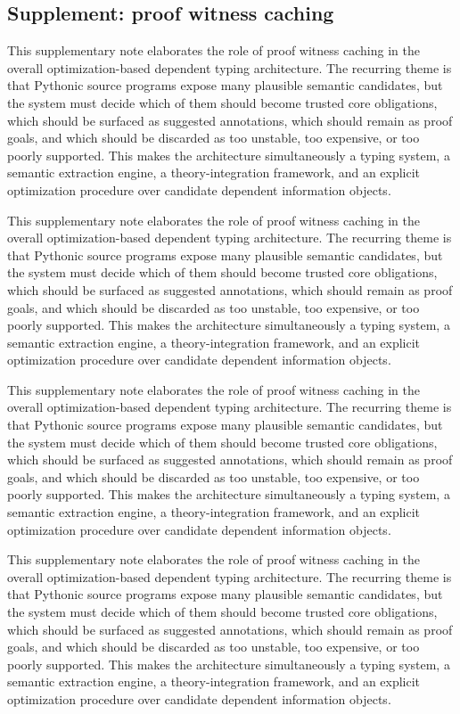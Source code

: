 \documentclass[11pt]{article}
\theoremstyle{definition}
\theoremstyle{plain}
\begin{document}
\subsection{Supplement: proof witness caching}
This supplementary note elaborates the role of proof witness caching in the overall
optimization-based dependent typing architecture. The recurring theme is that
Pythonic source programs expose many plausible semantic candidates, but the
system must decide which of them should become trusted core obligations, which
should be surfaced as suggested annotations, which should remain as proof
goals, and which should be discarded as too unstable, too expensive, or too
poorly supported. This makes the architecture simultaneously a typing system,
a semantic extraction engine, a theory-integration framework, and an explicit
optimization procedure over candidate dependent information objects.

This supplementary note elaborates the role of proof witness caching in the overall
optimization-based dependent typing architecture. The recurring theme is that
Pythonic source programs expose many plausible semantic candidates, but the
system must decide which of them should become trusted core obligations, which
should be surfaced as suggested annotations, which should remain as proof
goals, and which should be discarded as too unstable, too expensive, or too
poorly supported. This makes the architecture simultaneously a typing system,
a semantic extraction engine, a theory-integration framework, and an explicit
optimization procedure over candidate dependent information objects.

This supplementary note elaborates the role of proof witness caching in the overall
optimization-based dependent typing architecture. The recurring theme is that
Pythonic source programs expose many plausible semantic candidates, but the
system must decide which of them should become trusted core obligations, which
should be surfaced as suggested annotations, which should remain as proof
goals, and which should be discarded as too unstable, too expensive, or too
poorly supported. This makes the architecture simultaneously a typing system,
a semantic extraction engine, a theory-integration framework, and an explicit
optimization procedure over candidate dependent information objects.

This supplementary note elaborates the role of proof witness caching in the overall
optimization-based dependent typing architecture. The recurring theme is that
Pythonic source programs expose many plausible semantic candidates, but the
system must decide which of them should become trusted core obligations, which
should be surfaced as suggested annotations, which should remain as proof
goals, and which should be discarded as too unstable, too expensive, or too
poorly supported. This makes the architecture simultaneously a typing system,
a semantic extraction engine, a theory-integration framework, and an explicit
optimization procedure over candidate dependent information objects.
\end{document}
